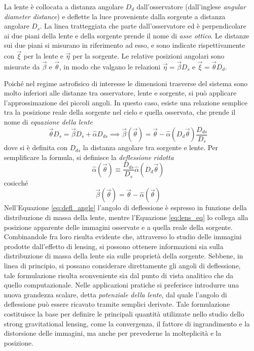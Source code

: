 La lente è collocata a distanza angolare $D_d$ dall'osservatore (dall'inglese \emph{angular diameter distance}) e deflette la luce proveniente dalla sorgente a distanza angolare $D_s$. La linea tratteggiata che parte dall'osservatore ed è perpendicolare ai due piani della lente e della sorgente prende il nome di \emph{asse ottico}. Le distanze sui due piani si misurano in riferimento ad esso, e sono indicate rispettivamente con $\vec \xi$ per la lente e $\vec \eta$ per la sorgente. Le relative posizioni angolari sono misurate da $\vec \beta$ e $\vec \theta$, in modo che valgano le relazioni $\vec \eta = \vec \beta D_s$ e $\vec \xi = \vec \theta D_d$.

Poiché nel regime astrofisico di interesse le dimensioni trasverse del sistema sono molto inferiori alle distanze tra osservatore, lente e sorgente, si può applicare l'approssimazione dei piccoli angoli. In questo caso, esiste una relazione semplice tra la posizione reale della sorgente nel cielo e quella osservata, che prende il nome di \emph{equazione della lente}
\begin{equation}
    \vec \theta D_s = \vec \beta D_s + \hat \alpha D_{ds} \implies \vec \beta (\vec \theta) = \vec \theta - \hat \alpha (D_d\vec\theta)\frac{D_{ds}}{D_s} 
    \label{eq:lens_eq}
\end{equation}
dove si è definita con $D_{ds}$ la distanza angolare tra sorgente e lente.
Per semplificare la formula, si definisce la \emph{deflessione ridotta}
\begin{equation}
  \hat{\alpha}(\vec\theta)\equiv \frac{D_{ds}}{D_s} \hat \alpha( D_d\vec\theta) 
\end{equation}
cosicché
\begin{equation}
    \vec \beta (\vec \theta) = \vec \theta - \hat \alpha (\vec\theta) 
\label{eq:lens_eq_real}    
\end{equation}
Nell'Equazione \ref{eq:defl_angle} l'angolo di deflessione è espresso in funzione della distribuzione di massa della lente, mentre l'Equazione \ref{eq:lens_eq} lo collega alla posizione apparente delle immagini osservate e a quella reale della sorgente. 
Combinandole fra loro risulta evidente che, attraverso lo studio delle immagini prodotte dall'effetto di lensing, si possono ottenere informazioni sia sulla distribuzione di massa della lente sia sulle proprietà della sorgente. Sebbene, in linea di principio, si possano considerare direttamente gli angoli di deflessione, tale formulazione risulta sconveniente sia dal punto di vista analitico che da quello computazionale. Nelle applicazioni pratiche si preferisce introdurre una nuova grandezza scalare, detta \emph{potenziale della lente}, dal quale l'angolo di deflessione può essere ricavato tramite semplici derivate. Tale formulazione costituisce la base per definire le principali quantità utilizzate nello studio dello strong gravitational lensing, come la convergenza, il fattore di ingrandimento e la distorsione delle immagini, ma anche per prevederne la molteplicità e la posizione. 

